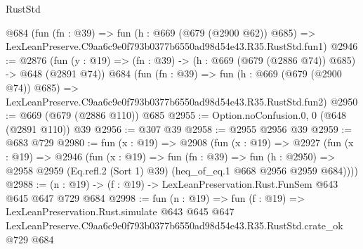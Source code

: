 \begin{lexlean}{RustStd}
\begin{coremodule}
    @684
    (fun (fn : @39) =>
    fun (h : @669 (@679 (@2900 @62)) @685) =>
    LexLeanPreserve.C9aa6c9e0f793b0377b6550ad98d54e43.R35.RustStd.fun1)
@2946 := @2876
    (fun (y : @19) => (fn : @39) -> (h : @669 (@679 (@2886 @74)) @685) -> @648 (@2891 @74))
    @684
    (fun (fn : @39) =>
    fun (h : @669 (@679 (@2900 @74)) @685) =>
    LexLeanPreserve.C9aa6c9e0f793b0377b6550ad98d54e43.R35.RustStd.fun2)
@2950 := @669 (@679 (@2886 @110)) @685
@2955 := Option.noConfusion.{0, 0} (@648 (@2891 @110)) @39
@2956 := @307 @39
@2958 := @2955 @2956 @39
@2959 := @683 @729
@2980 := fun (x : @19) =>
  @2908
    (fun (x : @19) =>
    @2927
      (fun (x : @19) =>
      @2946
        (fun (x : @19) =>
        fun (fn : @39) =>
        fun (h : @2950) =>
        @2958 @2959 (Eq.refl.{2} (Sort 1) @39) (heq_of_eq.{1} @668 @2956 @2959 @684))))
@2988 := (n : @19) -> (f : @19) -> LexLeanPreservation.Rust.FunSem @643 @645 @647 @729 @684
@2998 := fun (n : @19) =>
  fun (f : @19) =>
  LexLeanPreservation.Rust.simulate
    @643
    @645
    @647
    LexLeanPreserve.C9aa6c9e0f793b0377b6550ad98d54e43.R35.RustStd.crate_ok
    @729
    @684
\end{coremodule}
\end{lexlean}
